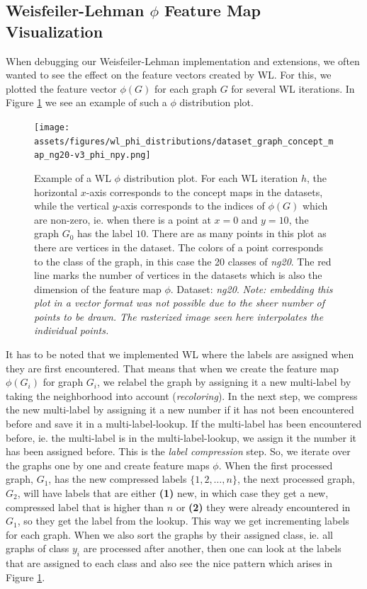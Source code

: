 \subsection{Weisfeiler-Lehman $\phi$ Feature Map Visualization}
When debugging our Weisfeiler-Lehman implementation and extensions, we often wanted to see the effect on the feature vectors created by WL.
For this, we plotted the feature vector $\phi(G)$ for each graph $G$ for several WL iterations.
In Figure \ref{fig:phi_distribution_example} we see an example of such a $\phi$ distribution plot.

\begin{figure}[htb!]
	\centering
	{\texttt{[image: assets/figures/wl\_phi\_distributions/dataset\_graph\_concept\_map\_ng20-v3\_phi\_npy.png]}
		\caption[Example: $\phi$ distribution plot]{%
			Example of a WL $\phi$ distribution plot.
			For each WL iteration $h$, the horizontal $x$-axis corresponds to the concept maps in the datasets, while the vertical $y$-axis corresponds to the indices of $\phi(G)$ which are non-zero, ie. when there is a point at $x=0$ and $y=10$, the graph $G_0$ has the label $10$.
			There are as many points in this plot as there are vertices in the dataset.
			The colors of a point corresponds to the class of the graph, in this case the 20 classes of \textit{ng20}.
			The red line marks the number of vertices in the datasets which is also the dimension of the feature map $\phi$.
			Dataset: \textit{ng20}.
			\textit{Note: embedding this plot in a vector format  was not possible due to the sheer number of points to be drawn. The rasterized image seen here interpolates the individual points.}
		}%
		\label{fig:phi_distribution_example}}
\end{figure}

It has to be noted that we implemented WL where the labels are assigned when they are first encountered. That means that when we create the feature map $\phi(G_i)$ for graph $G_i$, we relabel the graph by assigning it a new multi-label by taking the neighborhood into account (\textit{recoloring}). In the next step, we compress the new multi-label by assigning it a new number if it has not been encountered before and save it in a multi-label-lookup. If the multi-label has been encountered before, ie. the multi-label is in the multi-label-lookup, we assign it the number it has been assigned before.
This is the \textit{label compression} step.
So, we iterate over the graphs one by one and create feature maps $\phi$.
When the first processed graph, $G_1$, has the new compressed labels $\{1, 2, \ldots, n\}$, the next processed graph, $G_2$, will have labels that are either \textbf{(1)} new, in which case they get a new, compressed label that is higher than $n$ or \textbf{(2)} they were already encountered in $G_1$, so they get the label from the lookup.
This way we get incrementing labels for each graph.
When we also sort the graphs by their assigned class, ie. all graphs of class $y_i$ are processed after another, then one can look at the labels that are assigned to each class and also see the nice pattern which arises in Figure \ref{fig:phi_distribution_example}.

